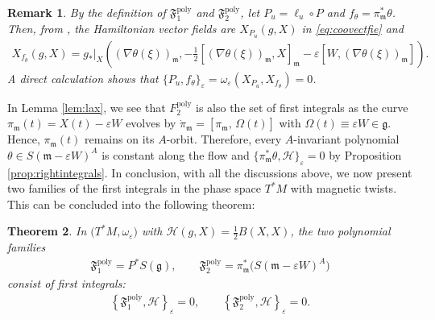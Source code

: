 \documentclass[11pt]{amsart}
\newtheorem{theorem}{Theorem}[section]
\theoremstyle{definition}
\theoremstyle{plain}
\newtheorem{remark}[theorem]{Remark}
\theoremstyle{conclusion}
\begin{document}
\begin{remark}
\label{rem:JY-pairing}
By the definition of $\mathfrak{F}_1^{\mathrm{poly}}$ and $\mathfrak{F}_2^{\mathrm{poly}}$, let $P_u = \ell_u \circ P$ and $f_\theta =  \pi_\mathfrak{m}^*\theta$. Then, from \cite{MR2141306}, the Hamiltonian vector fields are $ X_{P_u}(g,X)$ in \eqref{eq:coovectfie} and \begin{align}
  X_{f_\theta}(g,X)  =   g_*\vert_X \left((\nabla \theta(\xi))_\mathfrak{m}, - \frac{1}{2} [(\nabla \theta(\xi))_\mathfrak{m},X]_\mathfrak{m} - \varepsilon [W,(\nabla \theta(\xi))_\mathfrak{m}]\right).
\end{align} A direct calculation shows that $\{P_u,f_\theta\}_\varepsilon = \omega_\varepsilon(X_{P_u},X_{f_\theta}) = 0$. 
\end{remark}

In Lemma \ref{lem:lax}, we see that $F_2^{\mathrm{poly}}$ is also the set of first integrals as the curve $\pi_{\mathfrak{m}}(t)=X(t)-\varepsilon W$ evolves by $\dot\pi_{\mathfrak{m}}=[\pi_{\mathfrak{m}},\,\Omega(t)]$ with $\Omega(t)\equiv\varepsilon W \in \mathfrak{g}$. Hence, $\pi_{\mathfrak{m}}(t)$ remains on its $A$-orbit. Therefore, every $A$-invariant polynomial $\theta\in S(\mathfrak{m}-\varepsilon W)^A$ is constant along the flow and $\{\pi_{\mathfrak{m}}^*\theta,\mathcal{H}\}_\varepsilon=0$ by Proposition \ref{prop:rightintegrals}. In conclusion, with all the discussions above, we now present two families of the first integrals in the phase space $T^*M$ with magnetic twists. This can be concluded into the following theorem:
\begin{theorem} 
\label{thm:two-families} %
In $\big(T^*M,\omega_{\varepsilon}\big)$ with $\mathcal{H}(g,X)=\frac{1}{2} B(X,X)$, the two polynomial families \begin{align*}
\mathfrak{F}_1^{\mathrm{poly}}=P^*S(\mathfrak{g}), \qquad \mathfrak{F}_2^{\mathrm{poly}}=\pi_{\mathfrak{m}}^*\big(S(\mathfrak{m}-\varepsilon W)^A\big)
\end{align*} consist of first integrals: \begin{align*}
\left\{\mathfrak{F}_1^{\mathrm{poly}},\mathcal{H}\right\}_\varepsilon = 0, \qquad \left\{\mathfrak{F}_2^{\mathrm{poly}},\mathcal{H}\right\}_\varepsilon = 0.
\end{align*} 
\end{theorem}
\end{document}
